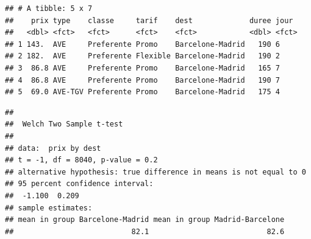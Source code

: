 \documentclass[
  11pt,
  letterpaper,
]{article}
\newenvironment{Shaded}{\begin{snugshade}}{\end{snugshade}}
\newcommand{\CommentTok}[1]{\textcolor[rgb]{0.56,0.35,0.01}{\textit{#1}}}
\newcommand{\DataTypeTok}[1]{\textcolor[rgb]{0.13,0.29,0.53}{#1}}
\newcommand{\DecValTok}[1]{\textcolor[rgb]{0.00,0.00,0.81}{#1}}
\newcommand{\KeywordTok}[1]{\textcolor[rgb]{0.13,0.29,0.53}{\textbf{#1}}}
\newcommand{\NormalTok}[1]{#1}
\newcommand{\OperatorTok}[1]{\textcolor[rgb]{0.81,0.36,0.00}{\textbf{#1}}}
\newcommand{\StringTok}[1]{\textcolor[rgb]{0.31,0.60,0.02}{#1}}
\theoremstyle{definition}
\theoremstyle{definition}
\theoremstyle{definition}
\theoremstyle{remark}
\begin{document}
\begin{Shaded}
\end{Shaded}

\begin{verbatim}
## # A tibble: 5 x 7
##    prix type    classe     tarif    dest             duree jour 
##   <dbl> <fct>   <fct>      <fct>    <fct>            <dbl> <fct>
## 1 143.  AVE     Preferente Promo    Barcelone-Madrid   190 6    
## 2 182.  AVE     Preferente Flexible Barcelone-Madrid   190 2    
## 3  86.8 AVE     Preferente Promo    Barcelone-Madrid   165 7    
## 4  86.8 AVE     Preferente Promo    Barcelone-Madrid   190 7    
## 5  69.0 AVE-TGV Preferente Promo    Barcelone-Madrid   175 4
\end{verbatim}

\begin{Shaded}
\end{Shaded}

\begin{verbatim}
## 
##  Welch Two Sample t-test
## 
## data:  prix by dest
## t = -1, df = 8040, p-value = 0.2
## alternative hypothesis: true difference in means is not equal to 0
## 95 percent confidence interval:
##  -1.100  0.209
## sample estimates:
## mean in group Barcelone-Madrid mean in group Madrid-Barcelone 
##                           82.1                           82.6
\end{verbatim}
\end{document}

